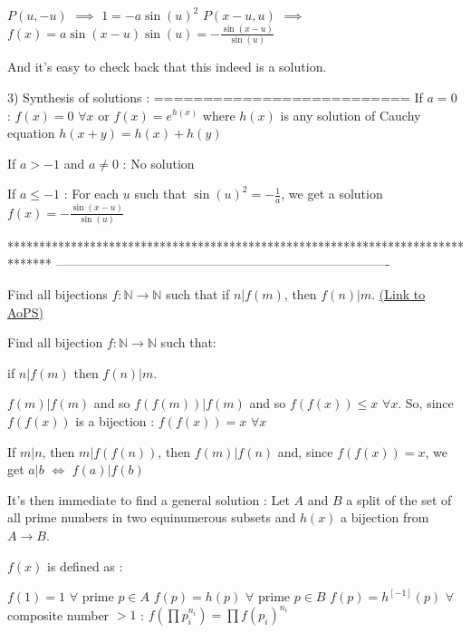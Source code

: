 \begin{solution}
$ P(u, - u)$ $ \implies$ $ 1 = - a\sin(u)^2$
$ P(x - u,u)$ $ \implies$ $ f(x) = a\sin(x - u)\sin(u) = - \frac {\sin(x - u)}{\sin(u)}$

And it's easy to check back that this indeed is a solution.

3) Synthesis of solutions :
==========================
If $ a = 0$ : $ f(x) = 0$ $ \forall x$ or $ f(x) = e^{h(x)}$ where $ h(x)$ is any solution of Cauchy equation $ h(x + y) = h(x) + h(y)$

If $ a > - 1$ and $ a\ne 0$ : No solution

If $ a\le - 1$ : For each $ u$ such that $ \sin(u)^2 = - \frac 1a$, we get a solution $ f(x) = - \frac {\sin(x - u)}{\sin(u)}$
\end{solution}
*******************************************************************************
-------------------------------------------------------------------------------

\begin{problem}
	Find all bijections $ f: \mathbb{N}\rightarrow \mathbb{N}$ such that if $n|f(m)$, then $ f(n)|m$.
	\flushright \href{https://artofproblemsolving.com/community/c6h311304}{(Link to AoPS)}
\end{problem}



\begin{solution}
	\begin{tcolorbox}Find all bijection $ f: \mathbb{N}\rightarrow \mathbb{N}$ such that:

if $ n|f(m)$   then   $ f(n)|m$.\end{tcolorbox}

$ f(m)|f(m)$ and so $ f(f(m))|f(m)$ and so $ f(f(x))\le x$ $ \forall x$. So, since $ f(f(x))$ is a bijection : $ f(f(x)) = x$ $ \forall x$

If $ m|n$, then $ m|f(f(n))$, then $ f(m)|f(n)$ and, since $ f(f(x)) = x$, we get $ a|b$ $ \iff$ $ f(a)|f(b)$

It's then immediate to find a general solution :
Let $ A$ and $ B$ a split of the set of all prime numbers in two equinumerous subsets and $ h(x)$ a bijection from $ A\to B$.

$ f(x)$ is defined as :

$ f(1) = 1$
$ \forall$ prime $ p\in A$ $ f(p) = h(p)$
$ \forall$ prime $ p\in B$ $ f(p) = h^{[ - 1]}(p)$
$ \forall$ composite number $ > 1$ : $ f(\prod p_i^{n_i}) = \prod f(p_i)^{n_i}$
\end{solution}



